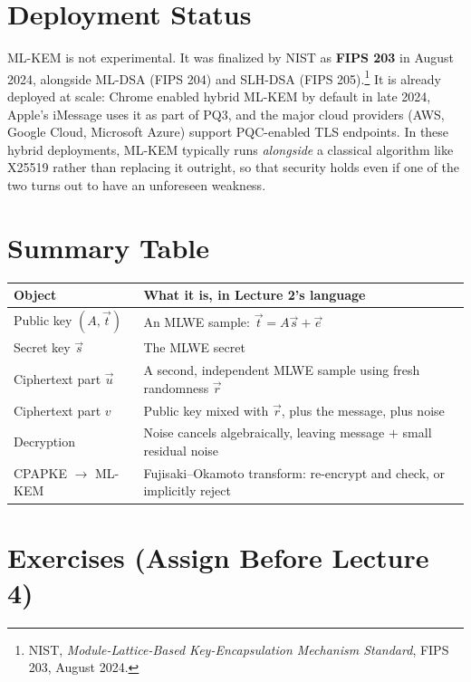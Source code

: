 \section{Deployment Status}
\label{sec:L3:deployment-status}

ML-KEM is not experimental. It was finalized by NIST as \textbf{FIPS 203} in August 2024, alongside ML-DSA (FIPS 204) and SLH-DSA (FIPS 205).\footnote{NIST, \emph{Module-Lattice-Based Key-Encapsulation Mechanism Standard}, FIPS 203, August 2024.} It is already deployed at scale: Chrome enabled hybrid ML-KEM by default in late 2024, Apple's iMessage uses it as part of PQ3, and the major cloud providers (AWS, Google Cloud, Microsoft Azure) support PQC-enabled TLS endpoints. In these hybrid deployments, ML-KEM typically runs \emph{alongside} a classical algorithm like X25519 rather than replacing it outright, so that security holds even if one of the two turns out to have an unforeseen weakness.

\section{Summary Table}
\label{sec:L3:summary-table}

\begin{center}
\renewcommand{\arraystretch}{1.3}
\begin{tabular}{|l|l|}
\hline
\textbf{Object} & \textbf{What it is, in Lecture 2's language} \\
\hline
Public key $(A,\vec t)$ & An MLWE sample: $\vec t = A\vec s+\vec e$ \\
Secret key $\vec s$ & The MLWE secret \\
Ciphertext part $\vec u$ & A second, independent MLWE sample using fresh randomness $\vec r$ \\
Ciphertext part $v$ & Public key mixed with $\vec r$, plus the message, plus noise \\
Decryption & Noise cancels algebraically, leaving message $+$ small residual noise \\
CPAPKE $\to$ ML-KEM & Fujisaki--Okamoto transform: re-encrypt and check, or implicitly reject \\
\hline
\end{tabular}
\end{center}

\section{Exercises (Assign Before Lecture 4)}
\label{sec:L3:exercises-assign-before-lecture-4}

